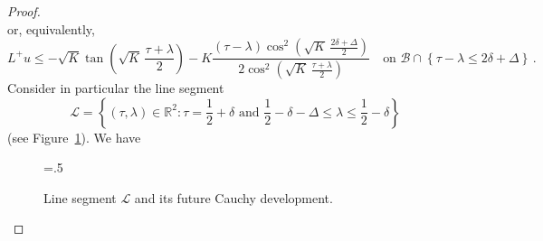 \documentclass[10pt]{amsart}
\newcommand{\bbR}{\mathbb{R}}      %
\begin{document}
\begin{proof}
\begin{equation}
\end{equation}
or, equivalently,
\begin{equation} 
L^+ u \leq - \sqrt{K} \tan \left( \sqrt{K} \, \frac{\tau + \lambda}2 \right) - K \frac{(\tau - \lambda)\cos^2 \left( \sqrt{K} \, \frac{2 \delta + \Delta}2 \right)}{2\cos^2 \left( \sqrt{K} \, \frac{\tau + \lambda}2 \right)} \quad \text{on } \mathcal{B} \cap \left\{ \tau - \lambda \leq 2 \delta + \Delta \right\} \, .
\end{equation}
Consider in particular the line segment
\begin{equation}
\mathcal{L} = \left\{ (\tau,\lambda) \in \bbR^2 : \tau = \frac12 + \delta \text{ and } \frac12 - \delta - \Delta \leq \lambda \leq \frac12 - \delta \right\}
\end{equation}
(see Figure~\ref{Domain3}). We have

\begin{figure}[h!]
\begin{center}
\epsfxsize=.5\textwidth
\leavevmode
{}
\end{center}
\caption{Line segment $\mathcal{L}$ and its future Cauchy development.} \label{Domain3}
\end{figure}


\end{proof}
\end{document}
